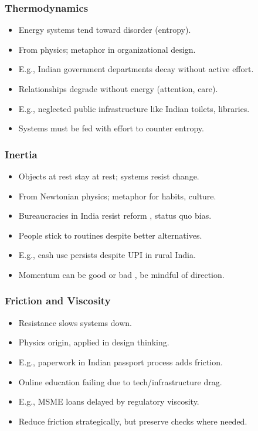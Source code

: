 \begin{frame}[fragile]\frametitle{Thermodynamics}
  \begin{itemize}
    \item Energy systems tend toward disorder (entropy).
    \item From physics; metaphor in organizational design.
    \item E.g., Indian government departments decay without active effort.
    \item Relationships degrade without energy (attention, care).
    \item E.g., neglected public infrastructure like Indian toilets, libraries.
    \item Systems must be fed with effort to counter entropy.
  \end{itemize}
\end{frame}

\begin{frame}[fragile]\frametitle{Inertia}
  \begin{itemize}
    \item Objects at rest stay at rest; systems resist change.
    \item From Newtonian physics; metaphor for habits, culture.
    \item Bureaucracies in India resist reform , status quo bias.
    \item People stick to routines despite better alternatives.
    \item E.g., cash use persists despite UPI in rural India.
    \item Momentum can be good or bad , be mindful of direction.
  \end{itemize}
\end{frame}

\begin{frame}[fragile]\frametitle{Friction and Viscosity}
  \begin{itemize}
    \item Resistance slows systems down.
    \item Physics origin, applied in design thinking.
    \item E.g., paperwork in Indian passport process adds friction.
    \item Online education failing due to tech/infrastructure drag.
    \item E.g., MSME loans delayed by regulatory viscosity.
    \item Reduce friction strategically, but preserve checks where needed.
  \end{itemize}
\end{frame}

